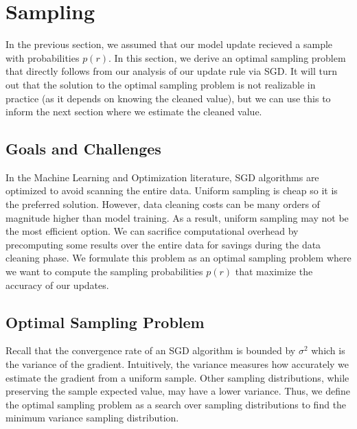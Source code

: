 \section{Sampling}\label{dist-samp}
In the previous section, we assumed that our model update recieved a sample with probabilities $p(r)$.
In this section, we derive an optimal sampling problem that directly follows from our analysis of our update rule via SGD.
It will turn out that the solution to the optimal sampling problem is not realizable in practice (as it depends on knowing the cleaned value), but we can use this to inform the next section where we estimate the cleaned value.

\subsection{Goals and Challenges}
In the Machine Learning and Optimization literature, SGD algorithms are optimized to avoid scanning the entire data.
Uniform sampling is cheap so it is the preferred solution.
However, data cleaning costs can be many orders of magnitude higher than model training.
As a result, uniform sampling may not be the most efficient option.
We can sacrifice computational overhead by precomputing some results over the entire data for savings during the data cleaning phase.
We formulate this problem as an optimal sampling problem where we want to compute the sampling probabilities $p(r)$ that maximize the accuracy of our updates.

\subsection{Optimal Sampling Problem}
Recall that the convergence rate of an SGD algorithm is bounded by $\sigma^2$ which is the variance of the gradient.
Intuitively, the variance measures how accurately we estimate the gradient from a uniform sample.
Other sampling distributions, while preserving the sample expected value, may have a lower variance.
Thus, we define the optimal sampling problem as a search over sampling distributions to find the minimum variance sampling distribution.

